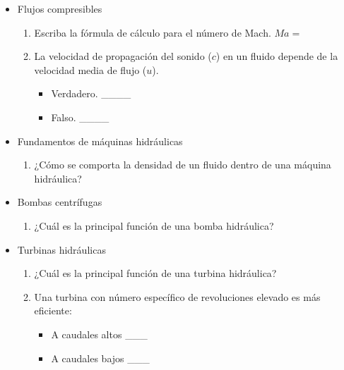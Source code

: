 \begin{itemize}
\begin{enumerate}
    \end{enumerate}
    
   \item Flujos compresibles
    \begin{enumerate}
    \item Escriba la fórmula de cálculo para el número de Mach. $Ma = $
    \item La velocidad de propagación del sonido ($c$) en un fluido depende de la velocidad media de flujo ($u$).
      \begin{itemize}
      \item Verdadero. \_\_\_\_
      \item Falso. \_\_\_\_
      \end{itemize}


    \end{enumerate}
    
   \item Fundamentos de máquinas hidráulicas
    \begin{enumerate}
    \item ¿Cómo se comporta la densidad de un fluido dentro de una máquina hidráulica?
    \end{enumerate}
    
   \item Bombas centrífugas
    \begin{enumerate}
    \item ¿Cuál es la principal función de una bomba hidráulica?



    \end{enumerate}
    
   \item Turbinas hidráulicas
    \begin{enumerate}
    \item ¿Cuál es la principal función de una turbina hidráulica?
    \item Una turbina con número específico de revoluciones elevado es más eficiente:
		\begin{itemize}
			\item A caudales altos \_\_\_
   			\item A caudales bajos \_\_\_
		\end{itemize}    
    \end{enumerate}

\end{itemize}